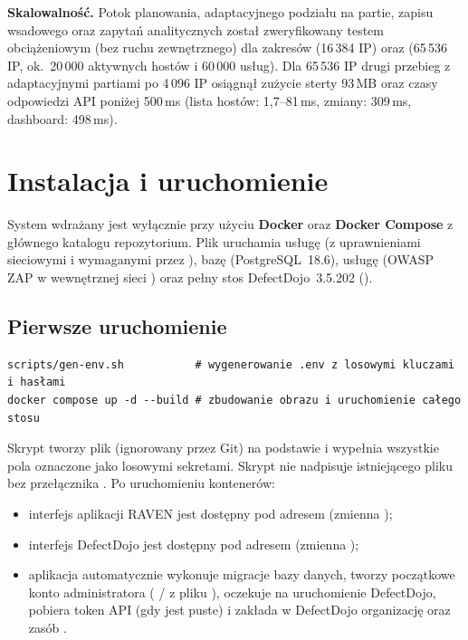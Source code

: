 \documentclass[10pt,a4paper]{article}
\begin{document}
\textbf{Skalowalność.} Potok planowania, adaptacyjnego podziału na partie, zapisu wsadowego oraz zapytań analitycznych został zweryfikowany testem obciążeniowym  (bez ruchu zewnętrznego) dla zakresów  (16\,384 IP) oraz  (65\,536 IP, ok.\ 20\,000 aktywnych hostów i 60\,000 usług). Dla 65\,536 IP drugi przebieg z adaptacyjnymi partiami po 4\,096 IP osiągnął zużycie sterty 93\,MB oraz czasy odpowiedzi API poniżej 500\,ms (lista hostów: 1,7--81\,ms, zmiany: 309\,ms, dashboard: 498\,ms).

\section{Instalacja i uruchomienie}

System wdrażany jest wyłącznie przy użyciu \textbf{Docker} oraz \textbf{Docker Compose} z głównego katalogu repozytorium. Plik  uruchamia usługę  (z uprawnieniami sieciowymi  i  wymaganymi przez ), bazę  (PostgreSQL~18.6), usługę  (OWASP ZAP w wewnętrznej sieci ) oraz pełny stos DefectDojo~3.5.202 ().

\subsection{Pierwsze uruchomienie}

\begin{cmdbox}
\begin{Verbatim}[fontsize=\footnotesize]
scripts/gen-env.sh           # wygenerowanie .env z losowymi kluczami i hasłami
docker compose up -d --build # zbudowanie obrazu i uruchomienie całego stosu
\end{Verbatim}
\end{cmdbox}

Skrypt  tworzy plik  (ignorowany przez Git) na podstawie  i wypełnia wszystkie pola oznaczone jako  losowymi sekretami. Skrypt nie nadpisuje istniejącego pliku  bez przełącznika . Po uruchomieniu kontenerów:
\begin{itemize}
  \item interfejs aplikacji RAVEN jest dostępny pod adresem  (zmienna );
  \item interfejs DefectDojo jest dostępny pod adresem  (zmienna );
  \item aplikacja  automatycznie wykonuje migracje bazy danych, tworzy początkowe konto administratora ( /  z pliku ), oczekuje na uruchomienie DefectDojo, pobiera token API (gdy  jest puste) i zakłada w DefectDojo organizację  oraz zasób .
\end{itemize}
\end{document}
